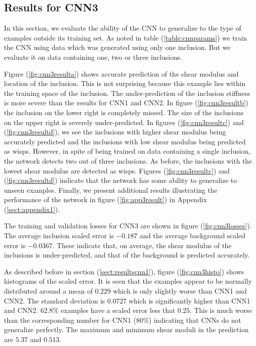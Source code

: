 \documentclass[12pt]{article}
\begin{document}
\subsection{\label{sect:resultscnn3}Results for CNN3}
In this section, we evaluate the ability of the CNN to generalize to the type of examples outside its training set. As noted in table (\ref{table:cnnparams}) we train the CNN using data which was generated using only one inclusion. But we evaluate it on data containing one, two or three inclusions.

Figure (\ref{fig:cnn3resulta}) shows accurate prediction of the shear modulus and location of the inclusion. This is not surprising because this example lies within the training space of the inclusion. The under-prediction of the inclusion stiffness is more severe than the results for CNN1 and CNN2. In figure (\ref{fig:cnn3resultb}) the inclusion on the lower right is completely missed. The size of the inclusions on the upper right is severely under-predicted. In figures (\ref{fig:cnn3resultc}) and (\ref{fig:cnn3resultd}), we see the inclusions with higher shear modulus being accurately predicted and the inclusions with low shear modulus being predicted as wisps. However, in spite of being trained on data containing a single inclusion, the network detects two out of three inclusions. As before, the inclusions with the lowest shear modulus are detected as wisps. Figures (\ref{fig:cnn3resultc}) and (\ref{fig:cnn3resultd}) indicate that the network has some ability to generalize to unseen examples. Finally, we present additional results illustrating the performance of the network in figure (\ref{fig:app3result}) in Appendix (\ref{sect:appendix1}).

The training and validation losses for CNN3 are shown in figure (\ref{fig:cnn3losses}). The average inclusion scaled error is $-0.187$ and the average background scaled error is $-0.0367$. These indicate that, on average, the shear modulus of the inclusions is under-predicted, and that of the background is predicted accurately.

As described before in section (\ref{sect:resultscnn1}), figure (\ref{fig:cnn3histo}) shows histograms of the scaled error. It is seen that the examples appear to be normally distributed around a mean of ${0.229}$ which is only slightly worse than CNN1 and CNN2. The standard deviation is $0.0727$ which is significantly higher than CNN1 and CNN2. $62.8\%$ examples have a scaled error less that $0.25$. This is much worse than the corresponding number for CNN1 ($80\%$) indicating that CNNs do not generalize perfectly. The maximum and minimum shear moduli in the prediction are $5.37$ and $0.513$.
\end{document}
